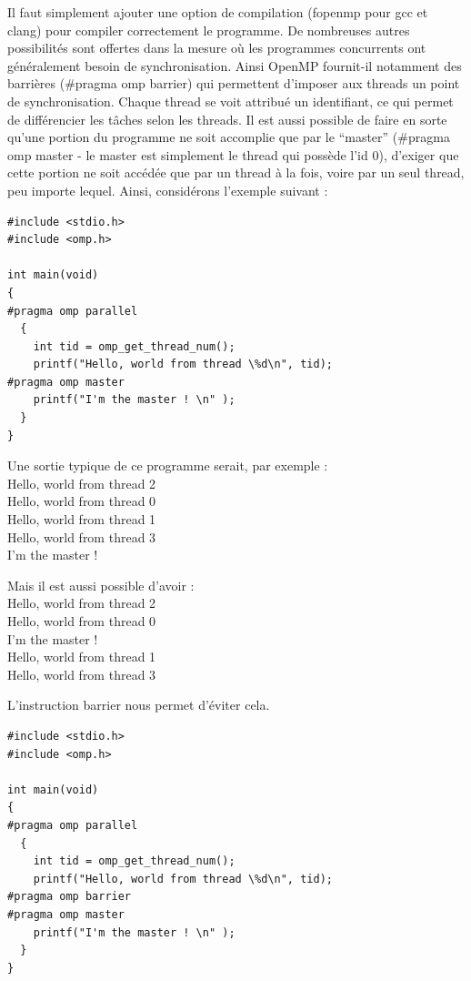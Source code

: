 \documentclass{report}
\begin{document}
Il faut simplement ajouter une option de compilation (fopenmp pour gcc et clang) pour compiler
correctement le programme.
De nombreuses autres possibilités sont offertes dans la mesure où les programmes concurrents ont
généralement besoin de synchronisation. Ainsi OpenMP fournit-il notamment des barrières (\#pragma
omp barrier) qui permettent d'imposer aux threads un point de synchronisation. Chaque thread se voit 
attribué un identifiant, ce qui permet de différencier les tâches selon les threads. Il est aussi
possible de faire en sorte qu'une portion du programme ne soit accomplie que par le ``master''
(\#pragma omp master - le master est simplement le thread qui possède l'id 0), d'exiger que cette
portion ne soit accédée que par un thread à la fois, voire par un seul thread, peu importe lequel.
Ainsi, considérons l'exemple suivant : 
\begin{lstlisting}
#include <stdio.h>
#include <omp.h>

int main(void)
{
#pragma omp parallel
  {
    int tid = omp_get_thread_num();
    printf("Hello, world from thread \%d\n", tid);
#pragma omp master
    printf("I'm the master ! \n" );
  }
}
\end{lstlisting}
Une sortie typique de ce programme serait, par exemple :
\\Hello, world from thread 2
\\Hello, world from thread 0
\\Hello, world from thread 1
\\Hello, world from thread 3
\\ I'm the master ! 

Mais il est aussi possible d'avoir :
\\Hello, world from thread 2
\\Hello, world from thread 0
\\ I'm the master ! 
\\Hello, world from thread 1
\\Hello, world from thread 3

 L'instruction barrier nous permet d'éviter cela.
\begin{lstlisting}
#include <stdio.h>
#include <omp.h>

int main(void)
{
#pragma omp parallel
  {
    int tid = omp_get_thread_num();
    printf("Hello, world from thread \%d\n", tid);
#pragma omp barrier
#pragma omp master
    printf("I'm the master ! \n" );
  }
}


\end{lstlisting}
\end{document}
